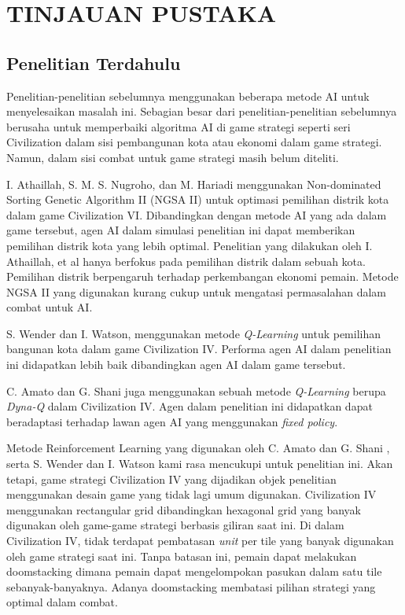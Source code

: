 \chapter{TINJAUAN PUSTAKA}
\label{chap:tinjauanpustaka}


\section{Penelitian Terdahulu}
\label{sec:penelitianterdahulu}

Penelitian-penelitian sebelumnya menggunakan beberapa metode AI untuk menyelesaikan masalah ini. Sebagian besar dari penelitian-penelitian sebelumnya berusaha untuk memperbaiki algoritma AI di game strategi seperti seri Civilization dalam sisi pembangunan kota atau ekonomi dalam game strategi. Namun, dalam sisi combat untuk game strategi masih belum diteliti.

I. Athaillah, S. M. S. Nugroho, dan M. Hariadi menggunakan Non-dominated Sorting Genetic Algorithm II (NGSA II) untuk optimasi pemilihan distrik kota dalam game Civilization VI. Dibandingkan dengan metode AI yang ada dalam game tersebut, agen AI dalam simulasi penelitian ini dapat memberikan pemilihan distrik kota yang lebih optimal. Penelitian yang dilakukan oleh I. Athaillah, et al hanya berfokus pada pemilihan distrik dalam sebuah kota. Pemilihan distrik berpengaruh terhadap perkembangan ekonomi pemain. Metode NGSA II yang digunakan kurang cukup untuk mengatasi permasalahan dalam combat untuk AI. 

S. Wender dan I. Watson, menggunakan metode \emph{Q-Learning} untuk pemilihan bangunan kota dalam game Civilization IV. Performa agen AI dalam penelitian ini didapatkan lebih baik dibandingkan agen AI dalam game tersebut.

C. Amato dan G. Shani juga menggunakan sebuah metode \emph{Q-Learning} berupa \emph{Dyna-Q} dalam Civilization IV. Agen dalam penelitian ini didapatkan dapat beradaptasi terhadap lawan agen AI yang menggunakan \emph{fixed policy}.

Metode Reinforcement Learning yang digunakan oleh C. Amato dan G. Shani \citep{civ4RL}, serta S. Wender dan I. Watson kami rasa mencukupi untuk penelitian ini. Akan tetapi, game strategi Civilization IV yang dijadikan objek penelitian menggunakan desain game yang tidak lagi umum digunakan. Civilization IV menggunakan rectangular grid dibandingkan hexagonal grid yang banyak digunakan oleh game-game strategi berbasis giliran saat ini. Di dalam Civilization IV, tidak terdapat pembatasan \emph{unit} per tile yang banyak digunakan oleh game strategi saat ini. Tanpa batasan ini, pemain dapat melakukan doomstacking dimana pemain dapat mengelompokan pasukan dalam satu tile sebanyak-banyaknya. Adanya doomstacking membatasi pilihan strategi yang optimal dalam combat.

